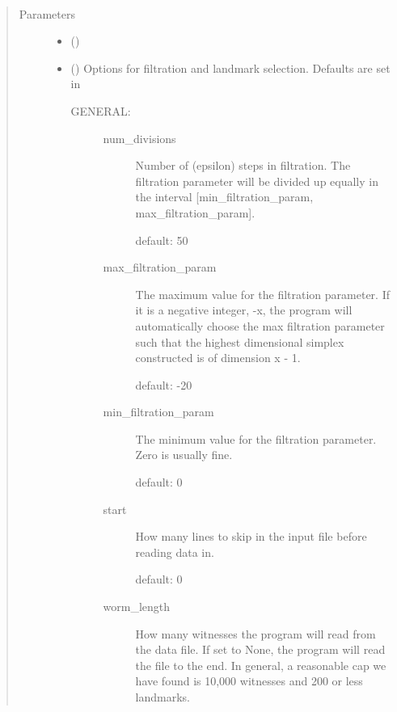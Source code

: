 \documentclass[letterpaper,10pt,openany,oneside,english]{sphinxmanual}
\begin{document}
\begin{fulllineitems}
\label{\detokenize{phomology:phomology.build_filtration.build_filtration}}~\begin{quote}\begin{description}
\item[{Parameters}] \leavevmode\begin{itemize}
\item {} 
 () \textendash{} 

\item {} 
 () \textendash{} 
Options for filtration and landmark selection. Defaults are set in
\begin{description}
\item[{GENERAL:}] \leavevmode\begin{description}
\item[{num\_divisions}] \leavevmode
Number of (epsilon) steps in filtration. The filtration
parameter will be divided up equally in the interval
{[}min\_filtration\_param, max\_filtration\_param{]}.

default: 50

\item[{max\_filtration\_param}] \leavevmode
The maximum value for the filtration parameter. If it is a
negative integer, -x, the program will automatically choose the
max filtration parameter such that the highest dimensional
simplex constructed is of dimension x - 1.

default: -20

\item[{min\_filtration\_param}] \leavevmode
The minimum value for the filtration parameter. Zero is usually
fine.

default: 0

\item[{start}] \leavevmode
How many lines to skip in the input file before reading data
in.

default: 0

\item[{worm\_length}] \leavevmode
How many witnesses the program will read from the data file.
If set to None, the program will read the file to the end. In
general, a reasonable cap we have found is 10,000 witnesses
and 200 or less landmarks.


\end{description}
\end{description}
\end{itemize}
\end{description}
\end{quote}
\end{fulllineitems}
\end{document}
